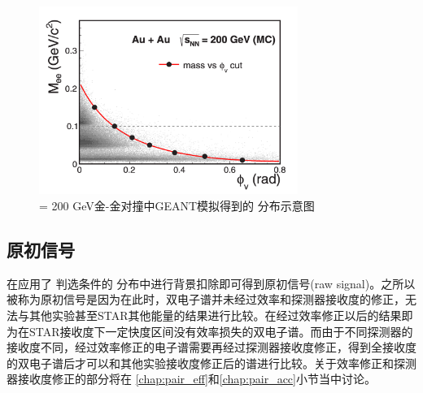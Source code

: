 \begin{figure}[htb]
  \begin{center}
  \includegraphics[width=0.75\textwidth,clip]{figures/Chapter4/PhiV.png}
  \end{center}
  \caption[\sNN = 200 GeV金-金对撞中模拟得到的 \PhiV 分布示意图]{\sNN = 200 GeV金-金对撞中GEANT模拟得到的 \PhiV 分布示意图}
  \label{c}
\end{figure}

\subsection{原初信号}
在应用了 \PhiV 判选条件的 \Npm 分布中进行背景扣除即可得到原初信号(raw signal)。之所以被称为原初信号是因为在此时，双电子谱并未经过效率和探测器接收度的修正，无法与其他实验甚至STAR其他能量的结果进行比较。在经过效率修正以后的结果即为在STAR接收度下一定快度区间没有效率损失的双电子谱。而由于不同探测器的接收度不同，经过效率修正的电子谱需要再经过探测器接收度修正，得到全接收度的双电子谱后才可以和其他实验接收度修正后的谱进行比较。关于效率修正和探测器接收度修正的部分将在 \ref{chap:pair_eff}和\ref{chap:pair_acc}小节当中讨论。